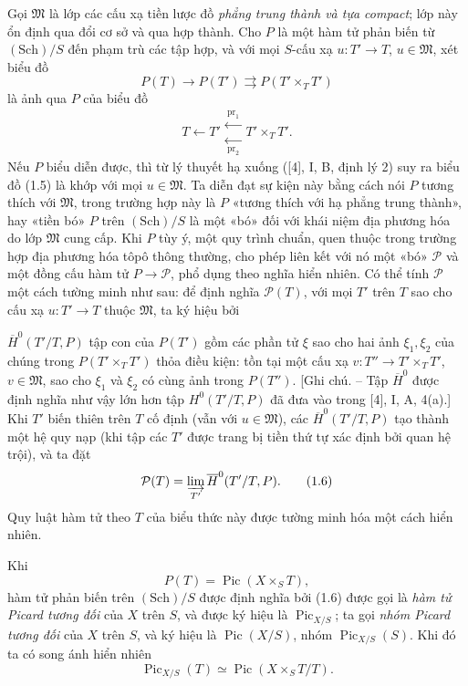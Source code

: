 \documentclass[11pt,twoside,openany]{book}
\numberwithin{equation}{section}
\newcommand{\src}[1]{%
  \phantomsection\hypertarget{src:\fgasourceid:#1}{}%
  \marginpar{\raggedleft\footnotesize\sffamily #1}%
}
\newcommand{\fgasourceid}{unset}
\begin{document}
Gọi $\mathfrak M$ là lớp các cấu xạ tiền lược đồ \emph{phẳng trung thành và tựa
compact}; lớp này ổn định qua đổi cơ sở và qua hợp thành. Cho $P$ là một hàm tử
phản biến từ $(\mathrm{Sch})/S$ đến phạm trù các tập hợp, và với mọi
$S$-cấu xạ $u:T'\longrightarrow T$, $u\in\mathfrak M$, xét biểu đồ
\begin{equation}
P(T)\longrightarrow P(T')\rightrightarrows P(T'\times_TT')
\tag{1.5}
\end{equation}
là ảnh qua $P$ của biểu đồ
\[
T\longleftarrow T'\mathrel{\substack{\xleftarrow{\,\mathrm{pr}_1\,}\\[-0.35ex]
\xleftarrow[\,\mathrm{pr}_2\,]{}}}T'\times_TT'.
\]
Nếu $P$ biểu diễn được, thì từ lý thuyết hạ xuống ([4], I, B, định lý 2) suy ra
biểu đồ (1.5) là khớp với mọi $u\in\mathfrak M$. Ta diễn đạt sự kiện này bằng
cách nói $P$ tương thích với $\mathfrak M$, trong trường hợp này là $P$
«tương thích với hạ phẳng trung thành», hay «tiền bó» $P$ trên
$(\mathrm{Sch})/S$ là một «bó» đối với khái niệm địa phương hóa do lớp
$\mathfrak M$ cung cấp. Khi $P$ tùy ý, một quy trình chuẩn, quen thuộc trong
trường hợp địa phương hóa tôpô thông thường, cho phép liên kết với nó một «bó»
$\mathcal P$ và một đồng cấu hàm tử $P\longrightarrow\mathcal P$, phổ dụng
theo nghĩa hiển nhiên. Có thể tính $\mathcal P$ một cách tường minh như sau:
để định nghĩa $\mathcal P(T)$, với mọi $T'$ trên $T$ sao cho cấu xạ
$u:T'\longrightarrow T$ thuộc $\mathfrak M$, ta ký hiệu bởi
\src{145}
$\overline H^0(T'/T,P)$ tập con của $P(T')$ gồm các phần tử $\xi$ sao cho hai
ảnh $\xi_1,\xi_2$ của chúng trong $P(T'\times_TT')$ thỏa điều kiện: tồn tại
một cấu xạ $v:T''\longrightarrow T'\times_TT'$, $v\in\mathfrak M$, sao cho
$\xi_1$ và $\xi_2$ có cùng ảnh trong $P(T'')$. [Ghi chú. -- Tập
$\overline H^0$ được định nghĩa như vậy lớn hơn tập $H^0(T'/T,P)$ đã đưa vào
trong [4], I, A, 4(a).] Khi $T'$ biến thiên trên $T$ cố định (vẫn với
$u\in\mathfrak M$), các $\overline H^0(T'/T,P)$ tạo thành một hệ quy nạp (khi
tập các $T'$ được trang bị tiền thứ tự xác định bởi quan hệ trội), và ta đặt
\begin{equation}
\mathcal P(T)=\varinjlim_{T'}\overline H^0(T'/T,P).
\tag{1.6}
\end{equation}
Quy luật hàm tử theo $T$ của biểu thức này được tường minh hóa một cách hiển
nhiên.

Khi
\[
P(T)=\operatorname{Pic}(X\times_ST),
\]
hàm tử phản biến trên $(\mathrm{Sch})/S$ được định nghĩa bởi (1.6) được gọi là
\emph{hàm tử Picard tương đối} của $X$ trên $S$, và được ký hiệu là
$\operatorname{Pic}_{X/S}$; ta gọi \emph{nhóm Picard tương đối} của $X$ trên
$S$, và ký hiệu là $\operatorname{Pic}(X/S)$, nhóm
$\operatorname{Pic}_{X/S}(S)$. Khi đó ta có song ánh hiển nhiên
\begin{equation}
\operatorname{Pic}_{X/S}(T)\simeq\operatorname{Pic}(X\times_ST/T).
\tag{1.7}
\end{equation}
\end{document}
